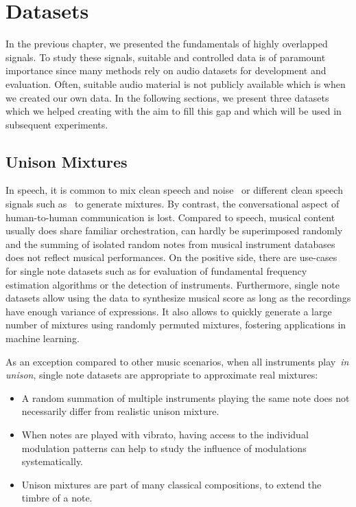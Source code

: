 \chapter{Datasets}
\label{cha:datasets}

In the previous chapter, we presented the fundamentals of highly overlapped signals.
To study these signals, suitable and controlled data is of paramount importance since many methods rely on audio datasets for development and evaluation.
Often, suitable audio material is not publicly available which is when we created our own data.
In the following sections, we present three datasets which we helped creating with the aim to fill this gap and which will be used in subsequent experiments.

\section{Unison Mixtures}
\label{sec:unison_dataset}

In speech, it is common to mix clean speech and noise~\cite{varga93} or different clean speech signals such as~\cite{garofolo93} to generate mixtures.
By contrast, the conversational aspect of human-to-human communication is lost.
Compared to speech, musical content usually does share familiar orchestration, can hardly be superimposed randomly and the summing of isolated random notes from musical instrument databases does not reflect musical performances.
On the positive side, there are use-cases for single note datasets such as for evaluation of fundamental frequency estimation algorithms or the detection of instruments.
Furthermore, single note datasets allow using the data to synthesize musical score as long as the recordings have enough variance of expressions.
It also allows to quickly generate a large number of mixtures using randomly permuted mixtures, fostering applications in machine learning.

As an exception compared to other music scenarios, when all instruments play~\emph{in unison}, single note datasets are appropriate to approximate real mixtures:

\begin{itemize}
  \item A random summation of multiple instruments playing the same note does not necessarily differ from realistic unison mixture.
  \item When notes are played with vibrato, having access to the individual modulation patterns can help to study the influence of modulations systematically.
  \item Unison mixtures are part of many classical compositions, to extend the timbre of a note.
\end{itemize}

